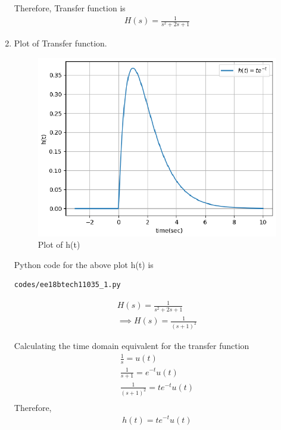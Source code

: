 \begin{enumerate}[label=\thesection.\arabic*.,ref=\thesection.\theenumi]
Therefore, Transfer function is 
\begin{align}
H(s) = \frac{1}{s^2+2s+1}
\end{align}

\item 
Plot of Transfer function.
\\ \solution  
\begin{figure}[!h]
\includegraphics[width=\columnwidth]{./figures/ee18btech11035_2.eps}
\caption{Plot of h(t)}
\label{fig:ee18btech11035_h(t)}
\end{figure}

Python code for the above plot h(t) is
\begin{lstlisting}
codes/ee18btech11035_1.py
\end{lstlisting}

\begin{align}
H(s) = \frac{1}{s^2+2s+1}\\
\implies H(s) = \frac{1}{(s+1)^2}
\end{align}

Calculating the time domain equivalent for the transfer function\\
\begin{align}
\label{eq:s}
\frac{1}{s} = u(t)\\
\label{eq:s+1}
\frac{1}{s+1} = e^{-t}u(t)\\
\label{eq:(s+1)^2}
\frac{1}{(s+1)^2} = te^{-t}u(t)\\
\end{align}
Therefore,
\begin{align}
h(t) = te^{-t}u(t)
\end{align}



\end{enumerate}
